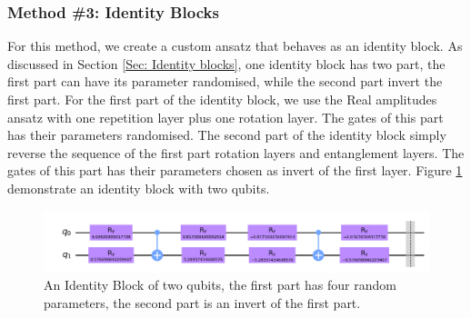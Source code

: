 \subsubsection{Method \#3: Identity Blocks} \label{Sec: Method3}
For this method, we create a custom ansatz that behaves as an identity block.
As discussed in Section \ref{Sec: Identity blocks}, one identity block has two part, the first part can have its parameter randomised, while the second part invert the first part.
For the first part of the identity block, we use the Real amplitudes ansatz with one repetition layer plus one rotation layer.
The gates of this part has their parameters randomised.
The second part of the identity block simply reverse the sequence of the first part rotation layers and entanglement layers.
The gates of this part has their parameters chosen as invert of the first layer.
Figure \ref{Fig: Identity Ansatz Sample} demonstrate an identity block with two qubits.
\begin{figure}
    \centering
    \includegraphics[width=\linewidth]{Artefact/Appendices/ansatz-identity.png}
    \caption{An Identity Block of two qubits, the first part has four random parameters, the second part is an invert of the first part.}
    \label{Fig: Identity Ansatz Sample}
\end{figure}
